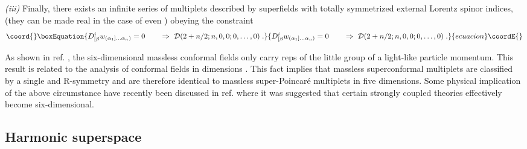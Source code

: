 \documentclass[a4paper,12pt]{article}
\begin{document}
{\sl (iii)} Finally, there exists an infinite series of 
multiplets described by superfields with \coordHE{} totally symmetrized 
external Lorentz spinor indices, 
\coordHE{} (they can be made real 
in the case of even \coordHE{}) obeying the constraint
\begin{equation}\coord{}\boxEquation{\label{6.24}
  D^i_{[\beta}w_{(\alpha_1]\ldots\alpha_n)} = 0 \qquad \Rightarrow \ {\cal 
D}(2+n/2;n,0,0;0,\ldots,0)\;. 
}{D^i_{[\beta}w_{(\alpha_1]\ldots\alpha_n)} = 0 \qquad \Rightarrow \ {\cal 
D}(2+n/2;n,0,0;0,\ldots,0)\;. 
}{ecuacion}\coordE{}\end{equation}

As shown in ref. \cite{FS3}, the six-dimensional massless 
conformal fields only carry reps \coordHE{} of the little group 
\coordHE{} of a light-like particle 
momentum. This result is related to the analysis of conformal 
fields in \coordHE{} dimensions \cite{Siegel1,AL}. This fact implies 
that massless superconformal multiplets are classified by a 
single \coordHE{} and \coordHE{} R-symmetry and are 
therefore identical to massless super-Poincar\'e multiplets in 
five dimensions. Some physical implication of the above 
circumstance have recently been discussed in ref. \cite{HULL2} 
where it was suggested that certain strongly coupled \coordHE{} 
theories effectively become six-dimensional. 



 

\subsection{Harmonic superspace}
\end{document}
